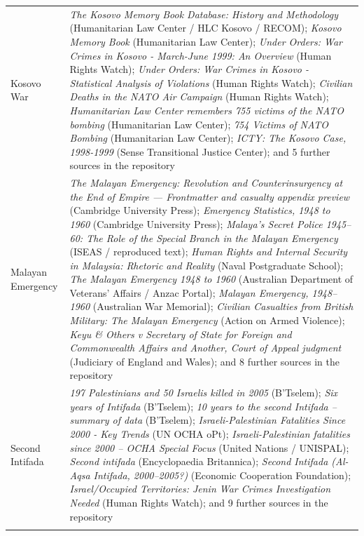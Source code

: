 \documentclass[11pt]{article}
\begin{document}
\begin{scriptsize}
\begin{longtable}{p{3.5cm} p{12.5cm}}
\addlinespace
Kosovo War & \emph{The Kosovo Memory Book Database: History and Methodology} (Humanitarian Law Center / HLC Kosovo / RECOM); \emph{Kosovo Memory Book} (Humanitarian Law Center); \emph{Under Orders: War Crimes in Kosovo - March-June 1999: An Overview} (Human Rights Watch); \emph{Under Orders: War Crimes in Kosovo - Statistical Analysis of Violations} (Human Rights Watch); \emph{Civilian Deaths in the NATO Air Campaign} (Human Rights Watch); \emph{Humanitarian Law Center remembers 755 victims of the NATO bombing} (Humanitarian Law Center); \emph{754 Victims of NATO Bombing} (Humanitarian Law Center); \emph{ICTY: The Kosovo Case, 1998-1999} (Sense Transitional Justice Center); and 5 further sources in the repository \\
\addlinespace
Malayan Emergency & \emph{The Malayan Emergency: Revolution and Counterinsurgency at the End of Empire — Frontmatter and casualty appendix preview} (Cambridge University Press); \emph{Emergency Statistics, 1948 to 1960} (Cambridge University Press); \emph{Malaya's Secret Police 1945–60: The Role of the Special Branch in the Malayan Emergency} (ISEAS / reproduced text); \emph{Human Rights and Internal Security in Malaysia: Rhetoric and Reality} (Naval Postgraduate School); \emph{The Malayan Emergency 1948 to 1960} (Australian Department of Veterans' Affairs / Anzac Portal); \emph{Malayan Emergency, 1948–1960} (Australian War Memorial); \emph{Civilian Casualties from British Military: The Malayan Emergency} (Action on Armed Violence); \emph{Keyu \& Others v Secretary of State for Foreign and Commonwealth Affairs and Another, Court of Appeal judgment} (Judiciary of England and Wales); and 8 further sources in the repository \\
\addlinespace
Second Intifada & \emph{197 Palestinians and 50 Israelis killed in 2005} (B'Tselem); \emph{Six years of Intifada} (B'Tselem); \emph{10 years to the second Intifada – summary of data} (B'Tselem); \emph{Israeli-Palestinian Fatalities Since 2000 - Key Trends} (UN OCHA oPt); \emph{Israeli-Palestinian fatalities since 2000 – OCHA Special Focus} (United Nations / UNISPAL); \emph{Second intifada} (Encyclopaedia Britannica); \emph{Second Intifada (Al-Aqsa Intifada, 2000–2005?)} (Economic Cooperation Foundation); \emph{Israel/Occupied Territories: Jenin War Crimes Investigation Needed} (Human Rights Watch); and 9 further sources in the repository \\
\addlinespace

\end{longtable}
\end{scriptsize}
\end{document}
